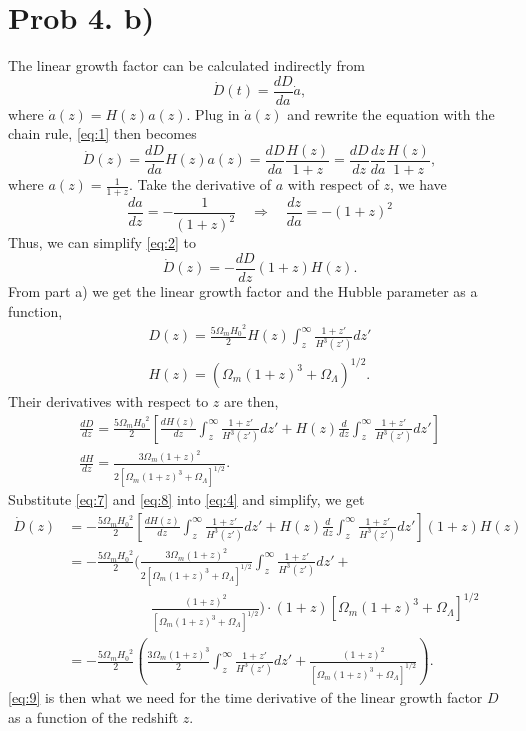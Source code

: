 \section{Prob 4. b)}

The linear growth factor can be calculated indirectly from
\begin{equation}\label{eq:1}
    \dot D(t) = \frac{dD}{da} \dot a, 
\end{equation}
where $\dot a(z) = H(z)a(z)$. Plug in $\dot a(z)$ and rewrite the equation with the chain rule, \cref{eq:1} then becomes
\begin{equation}\label{eq:2}
    \dot D(z) = \frac{dD}{da} H(z) a(z) = \frac{dD}{da} \frac{H(z)}{1+z} = \frac{dD}{dz} \frac{dz}{da} \frac{H(z)}{1+z},
\end{equation}
where $a(z) = \frac{1}{1+z}$. Take the derivative of $a$ with respect of $z$, we have
\begin{equation}
    \frac{da}{dz} = - \frac{1}{(1+z)^2} \quad
    \Rightarrow \quad \frac{dz}{da} = - (1+z)^2
\end{equation}
Thus, we can simplify \cref{eq:2} to 
\begin{equation}\label{eq:4}
    \dot D(z) = - \frac{dD}{dz} (1+z) H(z).
\end{equation}
From part a) we get the linear growth factor and the Hubble parameter as a function, 
\begin{gather}
    D(z) = \frac{5 \Omega_m {H_0}^2 }{2} H(z) \int_{z}^{\infty} \frac{1+z'}{H^3(z')} dz' \\
    H(z) = (\Omega_m (1+z)^3 + \Omega_{\Lambda})^{1/2}.
\end{gather}
Their derivatives with respect to $z$ are then,
\begin{gather}
    \label{eq:7}
    \frac{dD}{dz} = \frac{5 \Omega_m {H_0}^2 }{2} [\frac{dH(z)}{dz} \int_{z}^{\infty} \frac{1+z'}{H^3(z')} dz' + H(z) \frac{d}{dz} \int_{z}^{\infty} \frac{1+z'}{H^3(z')} dz'] \\ 
    \label{eq:8}
    \frac{dH}{dz} = \frac{3 \Omega_m (1+z)^2}{2[\Omega_m (1+z)^3 + \Omega_\Lambda]^{1/2}}.
\end{gather}
Substitute \cref{eq:7} and \cref{eq:8} into \cref{eq:4} and simplify, we get 
\begin{equation}\label{eq:9}
\begin{split}
    \dot D(z) &= - \frac{5 \Omega_m {H_0}^2 }{2} [\frac{dH(z)}{dz} \int_{z}^{\infty} \frac{1+z'}{H^3(z')} dz' + H(z) \frac{d}{dz} \int_{z}^{\infty} \frac{1+z'}{H^3(z')} dz'] (1+z) H(z) \\
    &= - \frac{5 \Omega_m {H_0}^2 }{2}  (\frac{3 \Omega_m (1+z)^2}{2[\Omega_m (1+z)^3 + \Omega_\Lambda]^{1/2}} \int_{z}^{\infty} \frac{1+z'}{H^3(z')} dz' + \\
    &\qquad \qquad \qquad \frac{(1+z)^2}{[\Omega_m (1+z)^3 + \Omega_\Lambda]^{1/2}}) \cdot (1+z) [\Omega_m (1+z)^3 + \Omega_\Lambda]^{1/2} \\
    &= - \frac{5 \Omega_m {H_0}^2 }{2} (\frac{3 \Omega_m (1+z)^3}{2} \int_{z}^{\infty} \frac{1+z'}{H^3(z')} dz' + \frac{(1+z)^2}{[\Omega_m (1+z)^3 + \Omega_\Lambda]^{1/2}}).
\end{split}
\end{equation}
\cref{eq:9} is then what we need for the time derivative of the linear growth factor $D$ as a function of the redshift $z$. 
